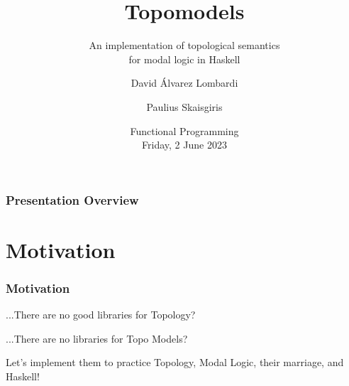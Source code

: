 \documentclass[
	11pt, %
	aspectratio=1610, %
]{beamer}
\title[Topomodels]{Topomodels} %
\subtitle{An implementation of topological semantics \\ for modal logic in Haskell} %
\author[David Álvarez Lombardi \& Paulius Skaisgiris]{David Álvarez Lombardi \and Paulius Skaisgiris} %
\institute[ILLC]{Institute for Logic, Language, and Computation \\ \smallskip University of Amsterdam} %
\date[Friday, 2 June 2023]{Functional Programming\\ \smallskip Friday, 2 June 2023} %
\begin{document}

\begin{frame}
	\titlepage %
\end{frame}



\begin{frame}
	\frametitle{Presentation Overview} %

	\tableofcontents[pausesections] %
\end{frame}


\section{Motivation}


\begin{frame}
	\frametitle{Motivation}

	...There are no good libraries for Topology?

	\bigskip

	...There are no libraries for Topo Models?

	Let's implement them to practice Topology, Modal Logic, their marriage, and Haskell!

	\end{frame}
\end{document}
